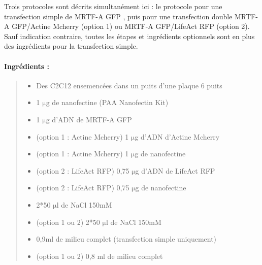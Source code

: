 \documentclass{report}
\newcommand{\micro}{$\mathrm{\mu}$}
\begin{document}
	Trois protocoles sont décrits simultanément ici : le protocole pour une transfection simple de MRTF-A GFP , puis pour une transfection double MRTF-A GFP/Actine Mcherry (option 1) ou MRTF-A GFP/LifeAct RFP (option 2). Sauf indication contraire, toutes les étapes et ingrédients optionnels sont en plus des ingrédients pour la transfection simple.
	
\paragraph{Ingrédients :}
\begin{quote}

	\begin{itemize}
	\item Des C2C12 ensemencées dans un puits d'une plaque 6 puits
	\item 1 \micro g de nanofectine (PAA Nanofectin Kit)
	\item 1 \micro g d'ADN de MRTF-A GFP
	\item (option 1 : Actine Mcherry) 1 \micro g d'ADN d'Actine Mcherry
	\item (option 1 : Actine Mcherry) 1 \micro g de nanofectine
	\item (option 2 : LifeAct RFP) 0,75 \micro g d'ADN de LifeAct RFP
	\item (option 2 : LifeAct RFP) 0,75 \micro g de nanofectine
	\item 2*50 \micro l de NaCl 150mM
	\item (option 1 ou 2) 2*50 \micro l de NaCl 150mM
	\item 0,9ml de milieu complet (transfection simple uniquement)
	\item (option 1 ou 2) 0,8 ml de milieu complet
	\end{itemize}
\end{quote}
\end{document}
